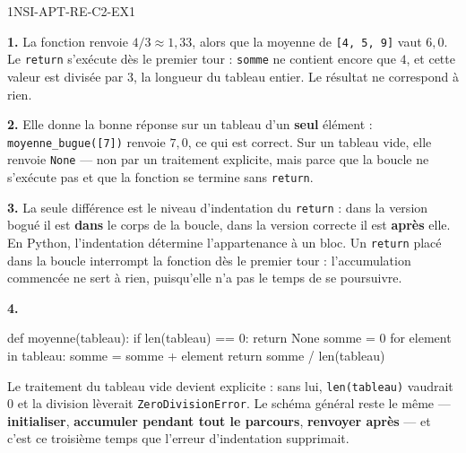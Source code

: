 
\begin{corrige}{1NSI-APT-RE-C2-EX1}

\textbf{1.} La fonction renvoie $4/3 \approx 1{,}33$, alors que la moyenne de
\lstinline{[4, 5, 9]} vaut $6{,}0$. Le \lstinline{return} s'exécute dès le premier tour :
\lstinline{somme} ne contient encore que $4$, et cette valeur est divisée par $3$, la
longueur du tableau entier. Le résultat ne correspond à rien.

\textbf{2.} Elle donne la bonne réponse sur un tableau d'un \textbf{seul} élément :
\lstinline{moyenne_bugue([7])} renvoie $7{,}0$, ce qui est correct. Sur un tableau vide,
elle renvoie \lstinline{None} — non par un traitement explicite, mais parce que la boucle
ne s'exécute pas et que la fonction se termine sans \lstinline{return}.

\textbf{3.} La seule différence est le niveau d'indentation du \lstinline{return} : dans la
version bogué il est \textbf{dans} le corps de la boucle, dans la version correcte il est
\textbf{après} elle. En Python, l'indentation détermine l'appartenance à un bloc. Un
\lstinline{return} placé dans la boucle interrompt la fonction dès le premier tour :
l'accumulation commencée ne sert à rien, puisqu'elle n'a pas le temps de se poursuivre.

\textbf{4.}
\begin{python}
def moyenne(tableau):
    if len(tableau) == 0:
        return None
    somme = 0
    for element in tableau:
        somme = somme + element
    return somme / len(tableau)
\end{python}
Le traitement du tableau vide devient explicite : sans lui, \lstinline{len(tableau)} vaudrait
$0$ et la division lèverait \lstinline{ZeroDivisionError}. Le schéma général reste le même —
\textbf{initialiser}, \textbf{accumuler pendant tout le parcours}, \textbf{renvoyer après} —
et c'est ce troisième temps que l'erreur d'indentation supprimait.

\end{corrige}
